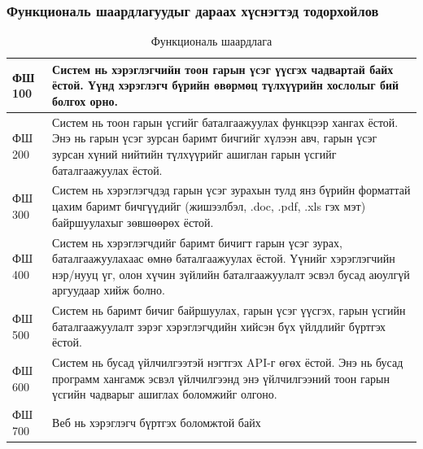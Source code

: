 \subsubsection{Функциональ шаардлагуудыг дараах хүснэгтэд тодорхойлов}
\begin{table}[h]
	\centering
	\caption{Функциональ шаардлага}
	\begin{tabular}{ |p{2cm}|p{13cm}| }
		\hline
		ФШ 100 & Систем нь хэрэглэгчийн тоон гарын үсэг үүсгэх чадвартай байх ёстой. Үүнд хэрэглэгч бүрийн өвөрмөц түлхүүрийн хослолыг бий болгох орно.                                                                             \\ \hline
		ФШ 200 & Систем нь тоон гарын үсгийг баталгаажуулах функцээр хангах ёстой. Энэ нь гарын үсэг зурсан баримт бичгийг хүлээн авч, гарын үсэг зурсан хүний нийтийн түлхүүрийг ашиглан гарын үсгийг баталгаажуулах ёстой.        \\ \hline
		ФШ 300 & Систем нь хэрэглэгчдэд гарын үсэг зурахын тулд янз бүрийн форматтай цахим баримт бичгүүдийг (жишээлбэл, .doc, .pdf, .xls гэх мэт) байршуулахыг зөвшөөрөх ёстой.                                                    \\ \hline
		ФШ 400 & Систем нь хэрэглэгчдийг баримт бичигт гарын үсэг зурах, баталгаажуулахаас өмнө баталгаажуулах ёстой. Үүнийг хэрэглэгчийн нэр/нууц үг, олон хүчин зүйлийн баталгаажуулалт эсвэл бусад аюулгүй аргуудаар хийж болно. \\ \hline
		ФШ 500 & Систем нь баримт бичиг байршуулах, гарын үсэг үүсгэх, гарын үсгийн баталгаажуулалт зэрэг хэрэглэгчдийн хийсэн бүх үйлдлийг бүртгэх ёстой.                                                                          \\ \hline
		ФШ 600 & Систем нь бусад үйлчилгээтэй нэгтгэх API-г өгөх ёстой. Энэ нь бусад программ хангамж эсвэл үйлчилгээнд энэ үйлчилгээний тоон гарын үсгийн чадварыг ашиглах боломжийг олгоно.                                        \\  \hline
		ФШ 700 & Веб нь хэрэглэгч бүртгэх боломжтой байх                                                                                                                                                                            \\ \hline
	\end{tabular}
\end{table}
\pagebreak
